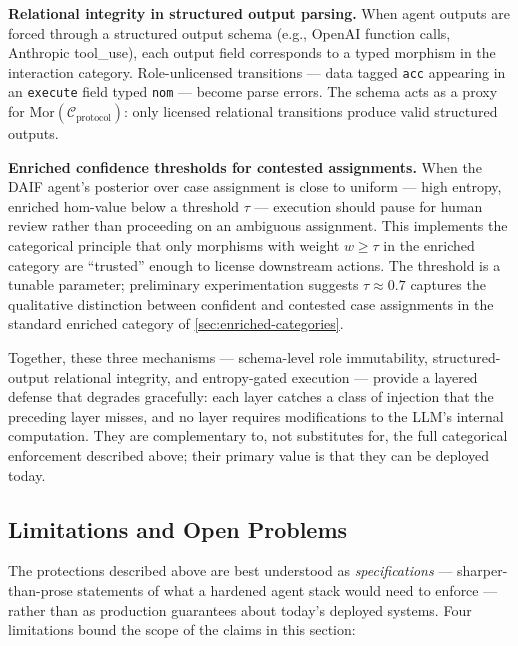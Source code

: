 \documentclass[
]{article}
\begin{document}
\textbf{Relational integrity in structured output parsing.} When agent
outputs are forced through a structured output schema (e.g., OpenAI
function calls, Anthropic tool\_use), each output field corresponds to a
typed morphism in the interaction category. Role-unlicensed transitions
--- data tagged \texttt{acc} appearing in an \texttt{execute} field
typed \texttt{nom} --- become parse errors. The schema acts as a proxy
for \(\text{Mor}(\mathcal{C}_{\text{protocol}})\): only licensed
relational transitions produce valid structured outputs.

\textbf{Enriched confidence thresholds for contested assignments.} When
the DAIF agent's posterior over case assignment is close to uniform ---
high entropy, enriched hom-value below a threshold \(\tau\) ---
execution should pause for human review rather than proceeding on an
ambiguous assignment. This implements the categorical principle that
only morphisms with weight \(w \geq \tau\) in the enriched category are
``trusted'' enough to license downstream actions. The threshold is a
tunable parameter; preliminary experimentation suggests
\(\tau \approx 0.7\) captures the qualitative distinction between
confident and contested case assignments in the standard enriched
category of \autoref{sec:enriched-categories}.

Together, these three mechanisms --- schema-level role immutability,
structured-output relational integrity, and entropy-gated execution ---
provide a layered defense that degrades gracefully: each layer catches a
class of injection that the preceding layer misses, and no layer
requires modifications to the LLM's internal computation. They are
complementary to, not substitutes for, the full categorical enforcement
described above; their primary value is that they can be deployed today.

\subsection{Limitations and Open
Problems}\label{sec:cognitive-security-limitations}

The protections described above are best understood as
\emph{specifications} --- sharper-than-prose statements of what a
hardened agent stack would need to enforce --- rather than as production
guarantees about today's deployed systems. Four limitations bound the
scope of the claims in this section:
\end{document}
